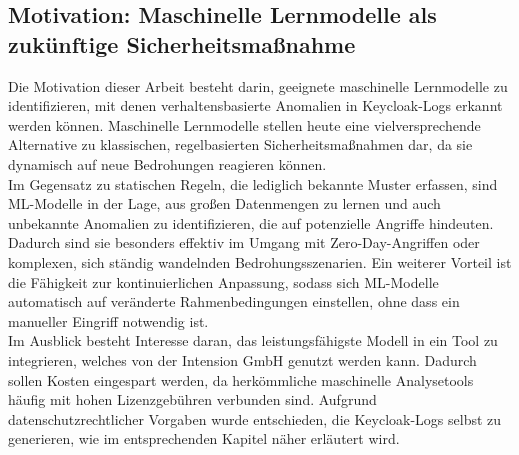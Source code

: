 \documentclass[a4paper,12pt]{article}
\begin{document}
	\subsection{Motivation: Maschinelle Lernmodelle als zukünftige Sicherheitsmaßnahme}
	Die Motivation dieser Arbeit besteht darin, geeignete maschinelle Lernmodelle zu identifizieren, mit denen verhaltensbasierte Anomalien in Keycloak-Logs erkannt werden können. Maschinelle Lernmodelle stellen heute eine vielversprechende Alternative zu klassischen, regelbasierten Sicherheitsmaßnahmen dar, da sie dynamisch auf neue Bedrohungen reagieren können.
	\\[0.5em]
	Im Gegensatz zu statischen Regeln, die lediglich bekannte Muster erfassen, sind ML-Modelle in der Lage, aus großen Datenmengen zu lernen und auch unbekannte Anomalien zu identifizieren, die auf potenzielle Angriffe hindeuten. Dadurch sind sie besonders effektiv im Umgang mit Zero-Day-Angriffen oder komplexen, sich ständig wandelnden Bedrohungsszenarien. Ein weiterer Vorteil ist die Fähigkeit zur kontinuierlichen Anpassung, sodass sich ML-Modelle automatisch auf veränderte Rahmenbedingungen einstellen, ohne dass ein manueller Eingriff notwendig ist.
	\\[0.5em]
	Im Ausblick besteht Interesse daran, das leistungsfähigste Modell in ein Tool zu integrieren, welches von der Intension GmbH genutzt werden kann. Dadurch sollen Kosten eingespart werden, da herkömmliche maschinelle Analysetools häufig mit hohen Lizenzgebühren verbunden sind. Aufgrund datenschutzrechtlicher Vorgaben wurde entschieden, die Keycloak-Logs selbst zu generieren, wie im entsprechenden Kapitel näher erläutert wird.
	
\end{document}

